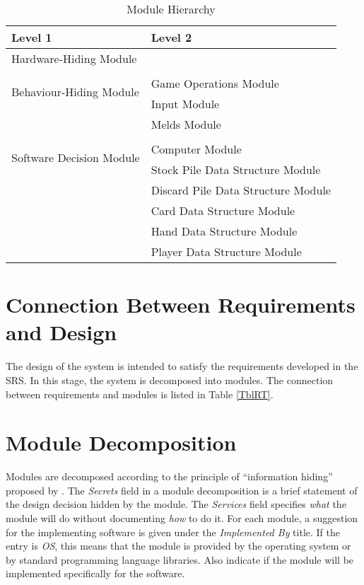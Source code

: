 \documentclass[12pt, titlepage]{article}
\begin{document}
\begin{table}[H]
    \centering
    \begin{tabular}{p{} p{}}
        \toprule
        \textbf{Level 1} & \textbf{Level 2}\\
        \midrule
        
        {Hardware-Hiding Module} & ~ \\
        \midrule
        
        \multirow{3}{0.3\textwidth}{Behaviour-Hiding Module}\\
        & Game Operations Module\\
        & Input Module\\
        & Melds Module\\
        \midrule
        
        \multirow{3}{0.3\textwidth}{Software Decision Module}\\
        & Computer Module\\
        & Stock Pile Data Structure Module\\
        & Discard Pile Data Structure Module\\
        & Card Data Structure Module\\
        & Hand Data Structure Module\\
        & Player Data Structure Module\\
        \bottomrule
        
    \end{tabular}
    \caption{Module Hierarchy}
    \label{TblMH}
\end{table}

\section{Connection Between Requirements and Design} \label{SecConnection}

The design of the system is intended to satisfy the requirements developed in
the SRS. In this stage, the system is decomposed into modules. The connection
between requirements and modules is listed in Table \ref{TblRT}.

\section{Module Decomposition} \label{SecMD}

Modules are decomposed according to the principle of ``information hiding''
proposed by \citet{ParnasEtAl1984}. The \emph{Secrets} field in a module
decomposition is a brief statement of the design decision hidden by the
module. The \emph{Services} field specifies \emph{what} the module will do
without documenting \emph{how} to do it. For each module, a suggestion for the
implementing software is given under the \emph{Implemented By} title. If the
entry is \emph{OS}, this means that the module is provided by the operating
system or by standard programming language libraries.  Also indicate if the
module will be implemented specifically for the software.
\end{document}
